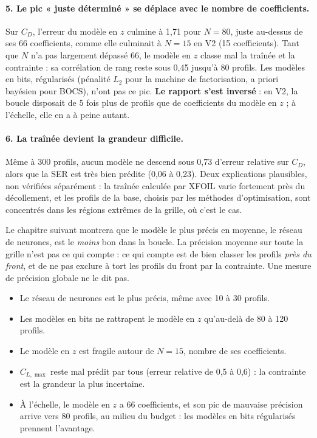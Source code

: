 \paragraph{5. Le pic « juste déterminé » se déplace avec le nombre de coefficients.} Sur $C_D$, l'erreur du modèle en $z$ culmine à 1,71 pour $N=80$, juste au-dessus de ses 66 coefficients, comme elle culminait à $N=15$ en V2 (15 coefficients). Tant que $N$ n'a pas largement dépassé 66, le modèle en $z$ classe mal la traînée et la contrainte : sa corrélation de rang reste sous 0,45 jusqu'à 80 profils. Les modèles en bits, régularisés (pénalité $L_2$ pour la machine de factorisation, a priori bayésien pour BOCS), n'ont pas ce pic. \textbf{Le rapport s'est inversé} : en V2, la boucle disposait de 5 fois plus de profils que de coefficients du modèle en $z$ ; à l'échelle, elle en a à peine autant.

\paragraph{6. La traînée devient la grandeur difficile.} Même à 300 profils, aucun modèle ne descend sous 0,73 d'erreur relative sur $C_D$, alors que la SER est très bien prédite (0,06 à 0,23). Deux explications plausibles, non vérifiées séparément : la traînée calculée par XFOIL varie fortement près du décollement, et les profils de la base, choisis par les méthodes d'optimisation, sont concentrés dans les régions extrêmes de la grille, où c'est le cas.

\begin{piege}
Le chapitre suivant montrera que le modèle le plus précis en moyenne, le réseau de neurones, est le \emph{moins} bon dans la boucle. La précision moyenne sur toute la grille n'est pas ce qui compte : ce qui compte est de bien classer les profils \emph{près du front}, et de ne pas exclure à tort les profils du front par la contrainte. Une mesure de précision globale ne le dit pas.
\end{piege}

\begin{resultat}
\begin{itemize}
\item Le réseau de neurones est le plus précis, même avec 10 à 30 profils.
\item Les modèles en bits ne rattrapent le modèle en $z$ qu'au-delà de 80 à 120 profils.
\item Le modèle en $z$ est fragile autour de $N=15$, nombre de ses coefficients.
\item $C_{L,\max}$ reste mal prédit par tous (erreur relative de 0,5 à 0,6) : la contrainte est la grandeur la plus incertaine.
\item À l'échelle, le modèle en $z$ a 66 coefficients, et son pic de mauvaise précision arrive vers 80 profils, au milieu du budget : les modèles en bits régularisés prennent l'avantage.
\end{itemize}
\end{resultat}

